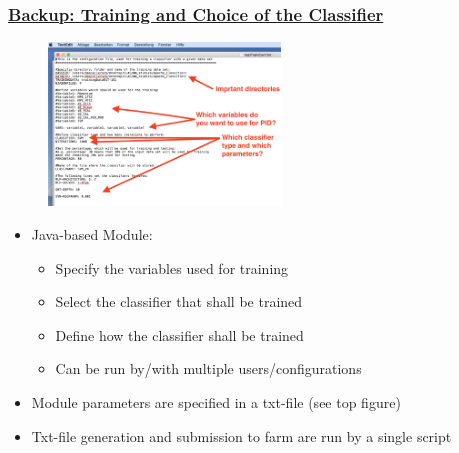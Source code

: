 \documentclass[xcolor=table, xcolor=dvipsnames]{beamer}
\begin{document}
\begin{frame}
  \frametitle{\hyperlink{bup}{Backup: Training and Choice of the Classifier}}
  \label{trainConf}
  \scriptsize
  
   \begin{figure}
    \includegraphics[width=0.55\textwidth]{trainConf2.png}
  \end{figure}
  
  \begin{itemize}
    \item Java-based Module:
    \begin{itemize}
      \scriptsize
      \item Specify the variables used for training
      \item Select the classifier that shall be trained
      \item Define how the classifier shall be trained 
      \item Can be run by/with multiple users/configurations
    \end{itemize}
    \item Module parameters are specified in a txt-file (see top figure)
     \item Txt-file generation and submission to farm are run by a single script
  \end{itemize}
\end{frame}
\end{document}
